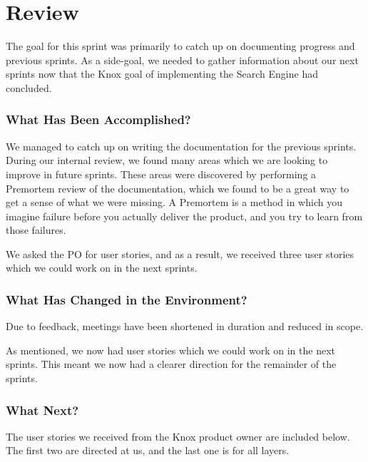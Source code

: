 \section{Review}
The goal for this sprint was primarily to catch up on documenting progress and previous sprints. As a side-goal, we needed to gather information about our next sprints now that the Knox goal of implementing the Search Engine had concluded.

\subsubsection*{What Has Been Accomplished?}
We managed to catch up on writing the documentation for the previous sprints. During our internal review, we found many areas which we are looking to improve in future sprints. These areas were discovered by performing a Premortem review of the documentation, which we found to be a great way to get a sense of what we were missing. A Premortem is a method in which you imagine failure before you actually deliver the product, and you try to learn from those failures\cite{PremortemSadanForbedrer}.

We asked the \knox{} PO for user stories, and as a result, we received three user stories which we could work on in the next sprints.

\subsubsection*{What Has Changed in the Environment?}
Due to feedback, meetings have been shortened in duration and reduced in scope. 

As mentioned, we now had user stories which we could work on in the next sprints. This meant we now had a clearer direction for the remainder of the sprints.

\subsubsection*{What Next?}
The user stories we received from the Knox product owner are included below. The first two are directed at us, and the last one is for all \knox{} layers.



